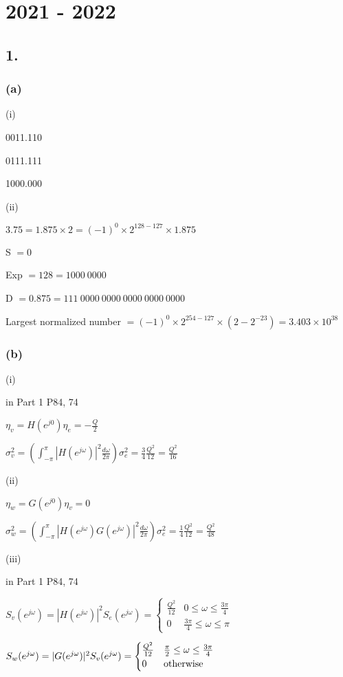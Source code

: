 \documentclass{article}
\begin{document}
\section*{2021 - 2022}
\subsection*{1.}
\subsubsection*{(a)}
(i)\par
0011.110\par
0111.111\par
1000.000\par\indent
\par
(ii)\par
$3.75=1.875 \times 2=(-1)^{0} \times 2^{128-127} \times 1.875$\par
S $=0$\par
Exp $=128=1000 \ 0000$\par
D $=0.875=111 \ 0000 \ 0000 \ 0000 \ 0000 \ 0000$\par
Largest normalized number $=(-1)^{0} \times 2^{254-127} \times (2-2^{-23}) = 3.403 \times 10^{38}$\par

\subsubsection*{(b)}
(i)\par
in Part 1 P84, 74\par
$\eta_{v}=H(e^{j0})\eta_{e}=-\frac{Q}{2}$\par
$\sigma_{v}^{2}=(\int_{-\pi}^{\pi}|H(e^{j\omega})|^{2}\frac{d\omega}{2\pi})\sigma_{e}^{2}=\frac{3}{4}\frac{Q^{2}}{12}=\frac{Q^{2}}{16}$\par\indent
\par
(ii)\par
$\eta_{w}=G(e^{j0})\eta_{v}=0$\par
$\sigma_{w}^{2}=(\int_{-\pi}^{\pi}|H(e^{j\omega})G(e^{j\omega})|^{2}\frac{d\omega}{2\pi})\sigma_{e}^{2}=\frac{1}{4}\frac{Q^{2}}{12}=\frac{Q^{2}}{48}$\par\indent
\par
(iii)\par
in Part 1 P84, 74\par
$S_{v}(e^{j\omega})=|H(e^{j\omega})|^{2}S_{e}(e^{j\omega})=\begin{cases}
\frac{Q^2}{12} &0 \leq \omega \leq \frac{3\pi}{4}\\
0 & \frac{3\pi}{4} \leq \omega \leq \pi
\end{cases}$\par\indent
\par
$S_{w}(e^{j\omega})=|G(e^{j\omega})|^{2}S_{v}(e^{j\omega})=\begin{cases}
\frac{Q^2}{12} &\frac{\pi}{2} \leq \omega \leq \frac{3\pi}{4}\\
0 & {\rm otherwise}
\end{cases}$
\end{document}
